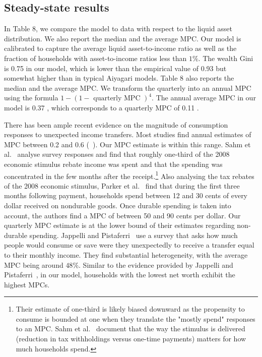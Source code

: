 \documentclass[\latexroot/\projectname]{subfiles}
\begin{document}


\subsection{Steady-state results}
In Table 8, we compare the model to data with respect to the liquid asset distribution. We also report the median and the average MPC. Our model is calibrated to capture the average liquid asset-to-income ratio as well as the fraction of households with asset-to-income ratios less than $1 \%$. The wealth Gini is 0.75 in our model, which is lower than the empirical value of 0.93 but somewhat higher than in typical Aiyagari models. Table 8 also reports the median and the average MPC. We transform the quarterly into an annual MPC using the formula $1-(1-\text { quarterly MPC })^{4}$. The annual average MPC in our model is 0.37 , which corresponds to a quarterly MPC of 0.11 .

There has been ample recent evidence on the magnitude of consumption responses to unexpected income transfers. Most studies find annual estimates of MPC between 0.2 and 0.6 (~\cite{Carroll2017-cp}). Our MPC estimate is within this range. Sahm et al.~\cite{Sahm2010-sz} analyse survey responses and find that roughly one-third of the 2008 economic stimulus rebate income was spent and that the spending was concentrated in the few months after the receipt.\footnote{Their estimate of one-third is likely biased downward as the propensity to consume is bounded at one when they translate the "mostly spend" responses to an MPC. Sahm et al.~\cite{Sahm2011-ta} document that the way the stimulus is delivered (reduction in tax withholdings versus one-time payments) matters for how much households spend.} Also analysing the tax rebates of the 2008 economic stimulus, Parker et al.~\cite{Parker2013-py} find that during the first three months following payment, households spend between 12 and 30 cents of every dollar received on nondurable goods. Once durable spending is taken into account, the authors find a MPC of between 50 and 90 cents per dollar. Our quarterly MPC estimate is at the lower bound of their estimates regarding non-durable spending. Jappelli and Pistaferri~\cite{Jappelli2014-og} use a survey that asks how much people would consume or save were they unexpectedly to receive a transfer equal to their monthly income. They find substantial heterogeneity, with the average MPC being around $48 \%$. Similar to the evidence provided by Jappelli and Pistaferri~\cite{Jappelli2014-og}, in our model, households with the lowest net worth exhibit the highest MPCs.
\end{document}
